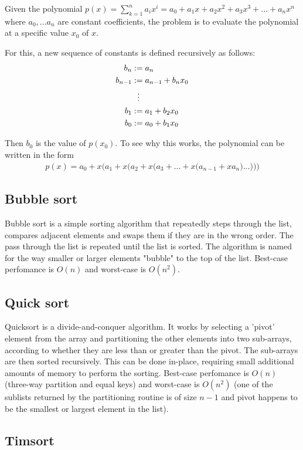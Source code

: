 \documentclass[a4paper,article,14pt]{extarticle}
\begin{document}
	Given the polynomial $p(x)=\sum_{k=1}^n a_i x^i=a_0+a_1 x+a_2 x^2+a_3 x^3+...+a_n x^n$ where $a_0,...a_n$ are constant coefficients, the problem is to evaluate the polynomial at a specific value $x_0$ of $x$.
	
	For this, a new sequence of constants is defined recursively as follows:
	\begin{align}
	b_n &:= a_n \\
	b_{n-1 } &:= a_{n-1}+b_n x_0 \\
	&\vdotswithin{:=} \notag \\
	b_1 &:= a_1+b_2 x_0\\
	b_0 &:= a_0+b_1x_0
	\end{align}
	
	Then $b_0$ is the value of $p(x_0)$. To see why this works, the polynomial can be written in the form 
	\begin{align}
	p(x)=a_0 +x\Bigg(a_1+x\bigg(a_2+x\Big(a_3+...+x\big(a_{n-1} + xa_n\big)...\Big)\bigg)\Bigg)
	\end{align}
	
	\subsection{Bubble sort}
	
	Bubble sort is a simple sorting algorithm that repeatedly steps through the list, compares adjacent elements and swaps them if they are in the wrong order. The pass through the list is repeated until the list is sorted. The algorithm is named for the way smaller or larger elements "bubble" to the top of the list. Best-case perfomance is $O(n)$ and worst-case is $O(n^2)$.
	\subsection{Quick sort}
	
	Quicksort is a divide-and-conquer algorithm. It works by selecting a 'pivot' element from the array and partitioning the other elements into two sub-arrays, according to whether they are less than or greater than the pivot. The sub-arrays are then sorted recursively. This can be done in-place, requiring small additional amounts of memory to perform the sorting. Best-case perfomance is $O(n)$ (three-way partition and equal keys) and worst-case is $O(n^2)$ (one of the sublists returned by the partitioning routine is of size $n - 1$ and pivot happens to be the smallest or largest element in the list).
	
	\subsection{Timsort}
	
\end{document}
